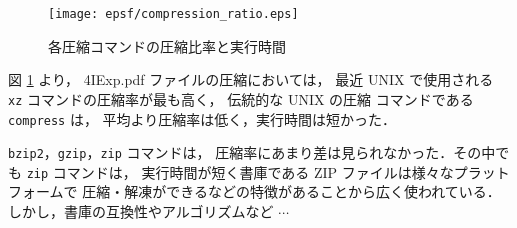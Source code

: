 \documentclass[a4j]{jreport}
\begin{document}
\begin{enumerate}[labelindent=\parindent, leftmargin=*, label=課題 \arabic*）]
	\begin{figure}[H]
	  \centering
	  \texttt{[image: epsf/compression\_ratio.eps]}
	  \vspace*{-0.5cm}
	  \caption{各圧縮コマンドの圧縮比率と実行時間}
	  \label{Figure: CompressionRatio and Times}
	\end{figure}

	図 \ref{Figure: CompressionRatio and Times} より，
	4IExp.pdf ファイルの圧縮においては，
	最近 UNIX で使用される \texttt{xz} コマンドの圧縮率が最も高く，
	伝統的な UNIX の圧縮 コマンドである \texttt{compress} は，
	平均より圧縮率は低く，実行時間は短かった．

	\texttt{bzip2}，\texttt{gzip}，\texttt{zip} コマンドは，
	圧縮率にあまり差は見られなかった．その中でも \texttt{zip} コマンドは，
	実行時間が短く書庫である ZIP ファイルは様々なプラットフォームで
	圧縮・解凍ができるなどの特徴があることから広く使われている．
											しかし，書庫の互換性やアルゴリズムなど $\cdots$

\end{enumerate}


\newpage				%
\end{document}
